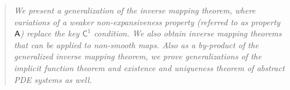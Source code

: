 \documentclass[a4, 12pt,leqno]{amsart}
\theoremstyle{plain}
\theoremstyle{definition}
\theoremstyle{remark}
\numberwithin{equation}{section}
\begin{document}
\maketitle

\begin{abstract}
\textsl{We present a generalization of the inverse mapping theorem, where variations of a weaker non-expansiveness property (referred to as property ${\sf A}$) replace the key $\mathsf{C}^1$ condition. We also obtain inverse mapping theorems that can be applied to non-smooth maps. Also as a by-product of the generalized inverse mapping theorem, we prove generalizations of the implicit function theorem and existence and uniqueness theorem of abstract PDE systems as well. 
}
\end{abstract}
\date{\today}

\end{document}
